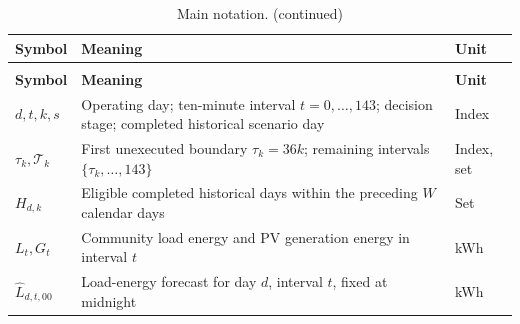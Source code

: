 \begin{longtable}[]{@{}
  >{\raggedright\arraybackslash}p{}
  >{\raggedright\arraybackslash}p{}
  >{\raggedright\arraybackslash}p{}@{}}
\caption{Main notation.}\tabularnewline
\toprule\noalign{}
\begin{minipage}[b]{\linewidth}\raggedright
\textbf{Symbol}
\end{minipage} & \begin{minipage}[b]{\linewidth}\raggedright
\textbf{Meaning}
\end{minipage} & \begin{minipage}[b]{\linewidth}\raggedright
\textbf{Unit}
\end{minipage} \\
\midrule\noalign{}
\endfirsthead
\caption[]{Main notation. (continued)}\tabularnewline
\toprule\noalign{}
\begin{minipage}[b]{\linewidth}\raggedright
\textbf{Symbol}
\end{minipage} & \begin{minipage}[b]{\linewidth}\raggedright
\textbf{Meaning}
\end{minipage} & \begin{minipage}[b]{\linewidth}\raggedright
\textbf{Unit}
\end{minipage} \\
\midrule\noalign{}
\endhead
\bottomrule\noalign{}
\endfoot
\bottomrule\noalign{}
\endlastfoot
\hspace{0.5pt}\(d,t,k,s\) & Operating day; ten-minute interval \(t=0,\ldots,143\); decision stage; completed historical scenario day & Index \\*
\hspace{0.5pt}\(\tau_k,\mathcal T_k\) & First unexecuted boundary \(\tau_k=36k\); remaining intervals \(\{\tau_k,\ldots,143\}\) & Index, set \\*
\hspace{0.5pt}\(H_{d,k}\) & Eligible completed historical days within the preceding \(W\) calendar days & Set \\
\hspace{0.5pt}\(L_t,G_t\) & Community load energy and PV generation energy in interval \(t\) & kWh \\
\hspace{0.5pt}\(\widehat L_{d,t,00}\) & Load-energy forecast for day \(d\), interval \(t\), fixed at midnight & kWh \\

\end{longtable}
